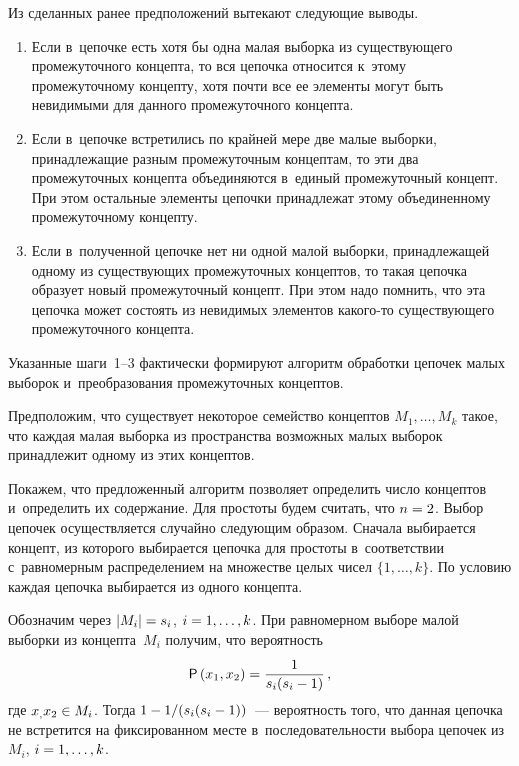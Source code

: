 \begin{multicols}{2}
  Из сделанных ранее предположений вытекают следующие выводы.\\[-14pt] 
  \begin{enumerate}[1.]
\item Если в~цепочке есть хотя бы одна малая выборка из существующего 
промежуточного концепта, то вся цепочка относится к~этому промежуточному 
концепту, хотя почти все ее элементы могут быть невидимыми для данного 
промежуточного концепта.\\[-14pt]
\item Если в~цепочке встретились по крайней мере две малые выборки, 
принадлежащие разным промежуточным концептам, то эти два промежуточных 
концепта объединяются в~единый промежуточный концепт. При этом остальные 
элементы цепочки принадлежат этому объединенному промежуточному 
концепту.\\[-14pt]
\item Если в~полученной цепочке нет ни одной малой выборки, принадлежащей 
одному из существующих промежуточных концептов, то такая цепочка образует 
новый промежуточный концепт. При этом надо помнить, что эта цепочка может 
состоять из невидимых элементов какого-то существующего промежуточного 
концепта.\\[-14pt] 
\end{enumerate}
  
  Указанные шаги~1--3 фактически формируют алгоритм обработки цепочек 
малых выборок и~преобразования промежуточных концептов. 
  
  Предположим, что существует некоторое семейство концептов $M_1,\ldots , 
M_k$ такое, что каждая малая выборка из пространства возможных малых 
выборок принадлежит одному из этих концептов. 
  
  Покажем, что предложенный алгоритм позволяет определить число концептов 
и~определить их содержание. Для простоты будем считать, что $n\hm= 2$. Выбор 
цепочек осуществляется случайно следующим образом. Сначала выбирается 
концепт, из которого выбирается цепочка для простоты в~соответствии 
с~равномерным распределением на множестве целых чисел $\{1,\ldots , k\}$. По 
условию каждая цепочка выбирается из одного концепта. 
  
  Обозначим через $\vert M_i\vert \hm=s_i$, $i\hm=1,\ldots , k$. При равномерном 
выборе малой выборки из кон\-цеп\-та~$M_i$ получим, что вероятность 
$$
{\sf P}\left(x_1,x_2\right)=\displaystyle\frac{\displaystyle 1\mathstrut}{\displaystyle s_i(s_i-1)\mathstrut}\,,
$$
 где $x_, x_2\hm\in M_i$. Тогда $1\hm- 1/(s_i(s_i\hm-
1))$~--- вероятность того, что данная цепочка не встретится на фиксированном 
месте в~последовательности выбора цепочек из~$M_i$, $i\hm=1,\ldots , k$. 
  

\end{multicols}
